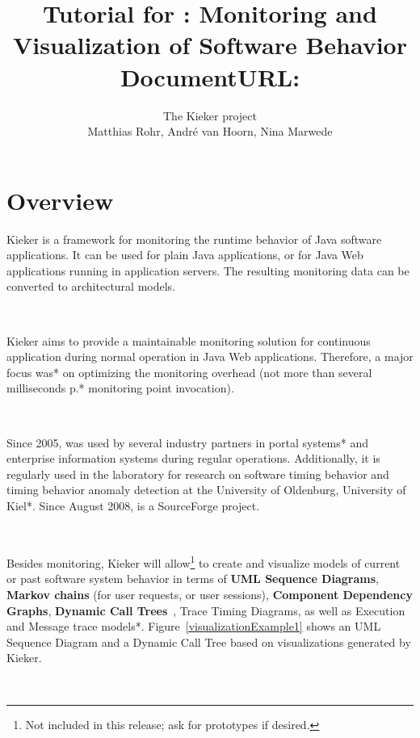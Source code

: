 \documentclass[a4paper,12pt]{scrartcl}
\title{Tutorial for \kieker{}: Monitoring and Visualization of Software Behavior \\ \small \vspace{3mm} DocumentURL: \kiekertutorialurl{}}
\author{The Kieker project \\ Matthias Rohr, Andr\'{e} van Hoorn, Nina Marwede}
\begin{document}
\maketitle
\tableofcontents
\section{Overview}


Kieker is a framework for monitoring the runtime behavior of Java software applications. It can be used for plain Java applications, or for Java Web applications running in application servers. The resulting monitoring data can be converted to architectural models.

\

Kieker aims to provide a maintainable monitoring solution for continuous application during normal operation in Java Web applications. Therefore, a major focus was* on optimizing the monitoring overhead (not more than several milliseconds p.* monitoring point invocation).

\

Since 2005, \tpmon{} was used by several industry partners in portal systems* and enterprise information systems during regular operations. Additionally, it is regularly used in the laboratory for research on software timing behavior and timing behavior anomaly detection at the University of Oldenburg, University of Kiel*. Since August 2008, \tpmon{} is a SourceForge project.

\

Besides monitoring, Kieker will allow\footnote{Not included in this release; ask for prototypes if desired.} to create and visualize models of current or past software system behavior in terms of \textbf{UML Sequence Diagrams}, \textbf{Markov chains} (for user requests, or user sessions), \textbf{Component Dependency Graphs}, \textbf{Dynamic Call Trees}~\citep{AmmonsBallLarus97ExploitingHardwarePerformanceCountersWithFlowAndContextSensitiveProfiling}, Trace Timing Diagrams, as well as Execution and Message trace models*. Figure~\ref{visualizationExample1} shows an UML Sequence Diagram and a Dynamic Call Tree based on visualizations generated by Kieker.

\
\end{document}
